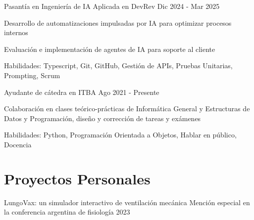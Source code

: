 \documentclass{resume}
\begin{document}
    \resumeSubheading
    {Pasantía en Ingeniería de IA Aplicada en DevRev}
    {}{}{Dic 2024 - Mar 2025}
    \vspace{-5mm}
    \resumeItemListStart
    \item
    {Desarrollo de automatizaciones impulsadas por IA para optimizar procesos internos}
    \item {Evaluación e implementación de agentes de IA para soporte al cliente}
    \item{Habilidades: Typescript, Git, GitHub, Gestión de APIs, Pruebas Unitarias, Prompting, Scrum}
    \resumeItemListEnd



    \resumeSubheading
    {Ayudante de cátedra en ITBA}{}
    {}{Ago 2021 - Presente}
    \vspace{-5mm}
    \resumeItemListStart
    \item
    {Colaboración en clases teórico-prácticas de Informática General y Estructuras de Datos y Programación,
        diseño y corrección de tareas y exámenes}
    \item {Habilidades: Python, Programación Orientada a Objetos, Hablar en público, Docencia}
    \resumeItemListEnd
    \resumeSubHeadingListEnd

    \vspace{-5mm}


    \section{\textbf{Proyectos Personales}} \label{sec:projects}
    \resumeSubHeadingListStart
    \resumeProject
    {LungoVax: un simulador interactivo de ventilación mecánica} %
    {Mención especial en la conferencia argentina de fisiología 2023} %
    {} %
\end{document}
